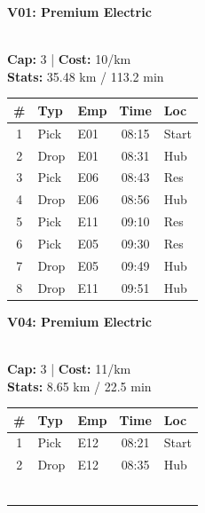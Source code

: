 \documentclass[a4paper,11pt]{article}
\begin{document}
\noindent
\begin{minipage}[t]{0.32\textwidth}
    \centering
    \colorbox{velorablue}{\parbox{\dimexpr\linewidth-2\fboxsep}{\centering \color{white}\textbf{V01: Premium Electric}}} \\
    \vspace{0.05cm}
    {\scriptsize \textbf{Cap:} 3 | \textbf{Cost:} 10/km \\ \textbf{Stats:} 35.48 km / 113.2 min}
    \vspace{0.1cm}
    
    \renewcommand{\arraystretch}{1.1}
    \setlength{\tabcolsep}{2pt}
    \scriptsize
    \begin{tabular}{c l l c l}
        \toprule
        \textbf{\#} & \textbf{Typ} & \textbf{Emp} & \textbf{Time} & \textbf{Loc} \\
        \midrule
        1 & Pick & E01 & 08:15 & Start \\
        \rowcolor{headergray} 2 & Drop & E01 & 08:31 & Hub \\
        3 & Pick & E06 & 08:43 & Res \\
        \rowcolor{headergray} 4 & Drop & E06 & 08:56 & Hub \\
        5 & Pick & E11 & 09:10 & Res \\
        \rowcolor{headergray} 6 & Pick & E05 & 09:30 & Res \\
        7 & Drop & E05 & 09:49 & Hub \\
        \rowcolor{headergray} 8 & Drop & E11 & 09:51 & Hub \\
        \bottomrule
    \end{tabular}
\end{minipage}
\hfill
\begin{minipage}[t]{0.32\textwidth}
    \centering
    \colorbox{velorablue}{\parbox{\dimexpr\linewidth-2\fboxsep}{\centering \color{white}\textbf{V04: Premium Electric}}} \\
    \vspace{0.05cm}
    {\scriptsize \textbf{Cap:} 3 | \textbf{Cost:} 11/km \\ \textbf{Stats:} 8.65 km / 22.5 min}
    \vspace{0.1cm}
    
    \renewcommand{\arraystretch}{1.1}
    \setlength{\tabcolsep}{2pt}
    \scriptsize
    \begin{tabular}{c l l c l}
        \toprule
        \textbf{\#} & \textbf{Typ} & \textbf{Emp} & \textbf{Time} & \textbf{Loc} \\
        \midrule
        1 & Pick & E12 & 08:21 & Start \\
        \rowcolor{headergray} 2 & Drop & E12 & 08:35 & Hub \\
        & & & & \\
        & & & & \\
        & & & & \\
        & & & & \\
        & & & & \\
        & & & & \\
        \bottomrule
    \end{tabular}
\end{minipage}
\end{document}
